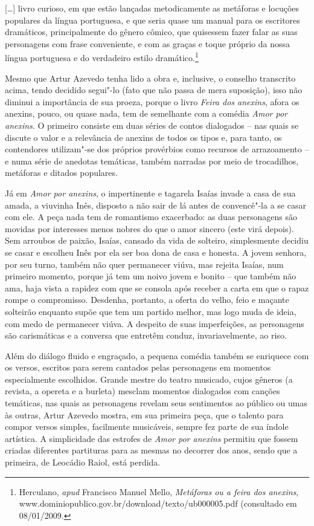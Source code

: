 \begin{hedraquote} 
\mbox{}[\ldots] livro curioso, em que estão lançadas metodicamente as metáforas e
locuções populares da língua portuguesa, e que seria quase um manual
para os escritores dramáticos, principalmente do gênero cômico, que
quisessem fazer falar as suas personagens com frase conveniente, e com
as graças e toque próprio da nossa língua portuguesa e do verdadeiro
estilo dramático.\footnote{ Herculano, \textit{apud }Francisco
Manuel Mello, \textit{Metáforas ou a feira dos anexins}, www.dominiopublico.gov.br/download/texto/ub000005.pdf
(consultado em 08/01/2009.}
\end{hedraquote} 

Mesmo que Artur Azevedo tenha lido a obra e, inclusive, o conselho
transcrito acima, tendo decidido segui"-lo (fato que não passa de mera suposição), isso não diminui a importância de sua proeza, porque o
livro \textit{Feira dos anexins}, afora os anexins, pouco, ou quase
nada, tem de semelhante com a comédia \textit{Amor por anexins}. O
primeiro consiste em duas séries de contos dialogados -- nas quais
se discute o valor e a relevância de anexins de todos os tipos e, para
tanto, os contendores utilizam"-se dos próprios provérbios como recursos
de arrazoamento -- e numa série de anedotas temáticas, também
narradas por meio de trocadilhos, metáforas e ditados populares. 

Já em \textit{Amor por anexins}, o impertinente e tagarela
Isaías invade a casa de sua amada, a viuvinha Inês, disposto a não sair
de lá antes de convencê"-la a se casar com ele. A peça nada tem de
romantismo exacerbado: as duas personagens são movidas por interesses
menos nobres do que o amor sincero (este virá depois). Sem arroubos de
paixão, Isaías, cansado da vida de solteiro, simplesmente decidiu se
casar e escolheu Inês por ela ser boa dona de casa e honesta. A jovem
senhora, por seu turno, também não quer permanecer viúva, mas rejeita
Isaías, num primeiro momento, porque já tem um noivo jovem e bonito --
que também não ama, haja vista a rapidez com que se consola após
receber a carta em que o rapaz rompe o compromisso.  Desdenha,
portanto, a oferta do velho, feio e maçante solteirão enquanto supõe
que tem um partido melhor, mas logo muda de ideia, com medo de
permanecer viúva. A despeito de suas imperfeições, as personagens são
carismáticas e a conversa que entretêm conduz, invariavelmente, ao
riso. 

Além do diálogo fluido e engraçado, a pequena comédia também se
enriquece com os versos, escritos para serem cantados pelas personagens
em momentos especialmente escolhidos. Grande mestre do teatro musicado,
cujos gêneros (a revista, a opereta e a burleta) mesclam momentos
dialogados com canções temáticas, nas quais as personagens revelam seus
sentimentos ao público ou umas às outras, Artur Azevedo mostra, em sua
primeira peça, que o talento para compor versos simples, facilmente
musicáveis, sempre fez parte de sua índole artística. A simplicidade
das estrofes de \textit{Amor por anexins} permitiu que fossem criadas
diferentes partituras para as mesmas no decorrer dos anos, sendo que a
primeira, de Leocádio Raiol, está perdida. 

